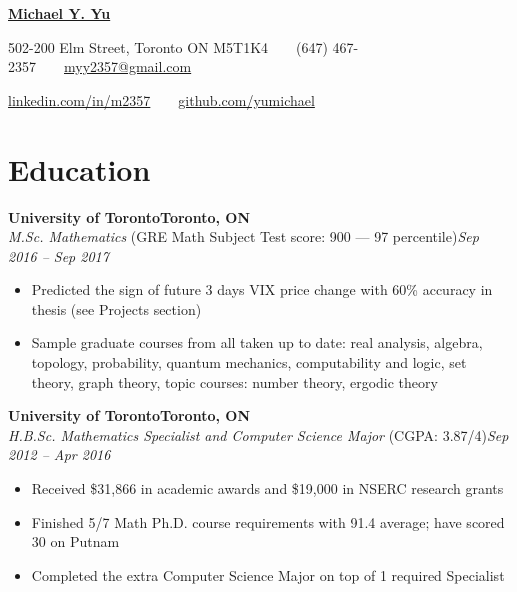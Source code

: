 \documentclass[10pt,letterpaper]{article}
\newcommand*\company[1]{\textbf{#1}}
\newcommand*\position[1]{\textit{#1}}
\newcommand*\location\company
\newcommand*\timespan\position
\begin{document}
\pagestyle{empty}
\begin{center}
{\huge\textbf{\href{https://github.com/yumichael/resume-v5}{Michael Y. Yu}}}

502-200 Elm Street, Toronto ON M5T1K4\ \ \textbullet\ \ (647) 467-2357\ \ \textbullet\ \ \href{mailto:myy2357@gmail.com}{myy2357@gmail.com}

\href{https://www.linkedin.com/in/m2357/}{linkedin.com/in/m2357}\ \ \textbullet\ \ \href{https://github.com/yumichael}{github.com/yumichael}
\end{center}
\section*{Education}
\company{University of Toronto}\hfill\location{Toronto, ON}\\
\position{M.Sc. Mathematics} (GRE Math Subject Test score: 900 --- 97 percentile)\hfill\timespan{Sep 2016 -- Sep 2017}
\begin{itemize}
\item Predicted the sign of future 3 days VIX price change with 60\% accuracy in thesis (see Projects section)
\item Sample graduate courses from all taken up to date: real analysis, algebra, topology, probability, quantum mechanics, computability and logic, set theory, graph theory, topic courses: number theory, ergodic theory
\end{itemize}
\company{University of Toronto}\hfill\location{Toronto, ON}\\
\position{H.B.Sc. Mathematics Specialist and Computer Science Major} (CGPA: 3.87/4)\hfill\timespan{Sep 2012 -- Apr 2016}
\begin{itemize}
\item Received \$31,866 in academic awards and \$19,000 in NSERC research grants
\item Finished 5/7 Math Ph.D. course requirements with 91.4 average; have scored 30 on Putnam
\item Completed the extra Computer Science Major on top of 1 required Specialist
\end{itemize}
\end{document}

